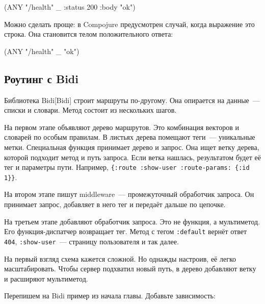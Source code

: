 
\begin{english}
  \begin{clojure}
(ANY "/health" _ {:status 200 :body "ok"})
  \end{clojure}
\end{english}

Можно сделать проще: в Compojure предусмотрен случай, когда выражение это
строка. Она становится телом положительного ответа:

\begin{english}
  \begin{clojure}
(ANY "/health" _ "ok")
  \end{clojure}
\end{english}

\subsection{Роутинг с Bidi}


Библиотека Bidi[Bidi] строит маршруты
по-другому. Она опирается на данные~--- списки и словари. Метод состоит из
нескольких шагов.

На первом этапе объявляют дерево маршрутов. Это комбинация векторов и словарей
по особым правилам. В листьях дерева помещают теги~--- уникальные
метки. Специальная функция принимает дерево и запрос. Она ищет ветку дерева,
которой подходит метод и путь запроса. Если ветка нашлась, результатом будет
её тег и параметры пути. Например, \verb|{:route :show-user :route-params: {:id 1}}|.


На втором этапе пишут middleware~--- промежуточный обработчик запроса. Он
принимает запрос, добавляет в него тег и передаёт дальше по цепочке.

На третьем этапе добавляют обработчик запроса. Это не функция, а мультиметод.
Его функция-диспатчер возвращает тег. Метод с тегом \verb|:default| вернёт
ответ \verb|404|, \verb|:show-user|~--- страницу пользователя и так далее.

На первый взгляд схема кажется сложной. Но однажды настроив, её легко
масштабировать. Чтобы сервер подхватил новый путь, в дерево добавляют ветку и
расширяют мультиметод.


Перепишем на Bidi пример из начала главы. Добавьте зависимость:

